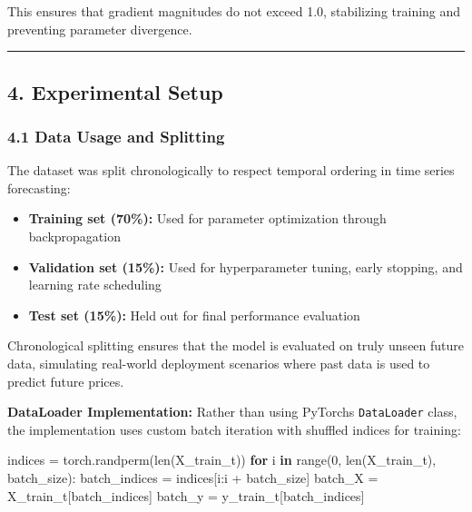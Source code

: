 \documentclass[
]{article}
\newenvironment{Shaded}{}{}
\newcommand{\BuiltInTok}[1]{\textcolor[rgb]{0.00,0.50,0.00}{#1}}
\newcommand{\ControlFlowTok}[1]{\textcolor[rgb]{0.00,0.44,0.13}{\textbf{#1}}}
\newcommand{\DecValTok}[1]{\textcolor[rgb]{0.25,0.63,0.44}{#1}}
\newcommand{\KeywordTok}[1]{\textcolor[rgb]{0.00,0.44,0.13}{\textbf{#1}}}
\newcommand{\NormalTok}[1]{#1}
\newcommand{\OperatorTok}[1]{\textcolor[rgb]{0.40,0.40,0.40}{#1}}
\begin{document}
This ensures that gradient magnitudes do not exceed 1.0, stabilizing
training and preventing parameter divergence.

\begin{center}\rule{0.5\linewidth}{0.5pt}\end{center}

\subsection{4. Experimental Setup}\label{4-experimental-setup}

\subsubsection{4.1 Data Usage and
Splitting}\label{41-data-usage-and-splitting}

The dataset was split chronologically to respect temporal ordering in
time series forecasting:

\begin{itemize}
\item
  \textbf{Training set (70\%):} Used for parameter optimization through
  backpropagation
\item
  \textbf{Validation set (15\%):} Used for hyperparameter tuning, early
  stopping, and learning rate scheduling
\item
  \textbf{Test set (15\%):} Held out for final performance evaluation
\end{itemize}

Chronological splitting ensures that the model is evaluated on truly
unseen future data, simulating real-world deployment scenarios where
past data is used to predict future prices.

\textbf{DataLoader Implementation:} Rather than using
PyTorch\textquotesingle s \texttt{DataLoader} class, the implementation
uses custom batch iteration with shuffled indices for training:

\begin{Shaded}
\begin{Highlighting}[]
\NormalTok{indices }\OperatorTok{=}\NormalTok{ torch.randperm(}\BuiltInTok{len}\NormalTok{(X\_train\_t))}
\ControlFlowTok{for}\NormalTok{ i }\KeywordTok{in} \BuiltInTok{range}\NormalTok{(}\DecValTok{0}\NormalTok{, }\BuiltInTok{len}\NormalTok{(X\_train\_t), batch\_size):}
\NormalTok{    batch\_indices }\OperatorTok{=}\NormalTok{ indices[i:i }\OperatorTok{+}\NormalTok{ batch\_size]}
\NormalTok{    batch\_X }\OperatorTok{=}\NormalTok{ X\_train\_t[batch\_indices]}
\NormalTok{    batch\_y }\OperatorTok{=}\NormalTok{ y\_train\_t[batch\_indices]}
\end{Highlighting}
\end{Shaded}
\end{document}
